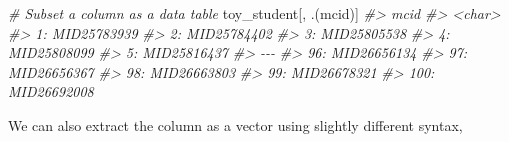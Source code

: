 \documentclass[
]{book}
\newenvironment{Shaded}{\begin{snugshade}}{\end{snugshade}}
\newcommand{\CommentTok}[1]{\textcolor[rgb]{0.56,0.35,0.01}{\textit{#1}}}
\newcommand{\NormalTok}[1]{#1}
\begin{document}
\begin{Shaded}
\begin{Highlighting}[]
\CommentTok{\# Subset a column as a data table}
\NormalTok{toy\_student[, .(mcid)]}
\CommentTok{\#\textgreater{}             mcid}
\CommentTok{\#\textgreater{}           \textless{}char\textgreater{}}
\CommentTok{\#\textgreater{}   1: MID25783939}
\CommentTok{\#\textgreater{}   2: MID25784402}
\CommentTok{\#\textgreater{}   3: MID25805538}
\CommentTok{\#\textgreater{}   4: MID25808099}
\CommentTok{\#\textgreater{}   5: MID25816437}
\CommentTok{\#\textgreater{}  {-}{-}{-}            }
\CommentTok{\#\textgreater{}  96: MID26656134}
\CommentTok{\#\textgreater{}  97: MID26656367}
\CommentTok{\#\textgreater{}  98: MID26663803}
\CommentTok{\#\textgreater{}  99: MID26678321}
\CommentTok{\#\textgreater{} 100: MID26692008}
\end{Highlighting}
\end{Shaded}

We can also extract the column as a vector using slightly different syntax,
\end{document}
